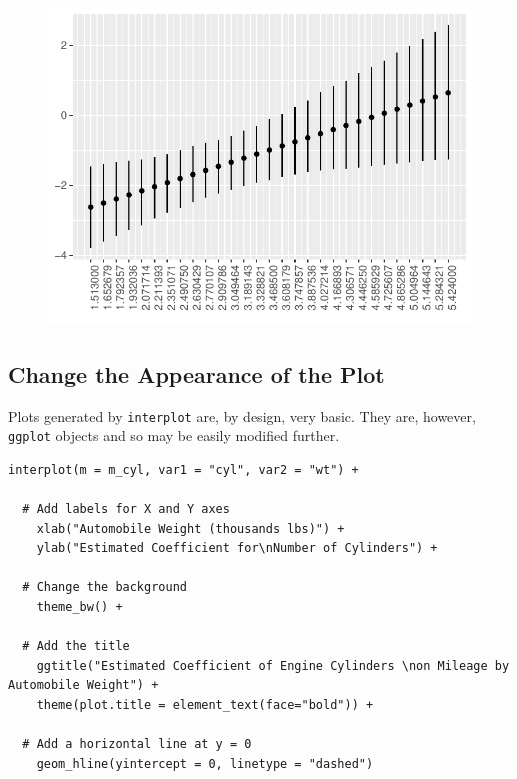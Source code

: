 \documentclass[
  article]{jss}
\begin{document}
\begin{figure}[H]

{\centering \includegraphics{jss_manuscript_files/figure-pdf/unnamed-chunk-6-1.pdf}

}

\end{figure}

\hypertarget{sec-change-the-appearance-of-the-plot}{%
\subsection{Change the Appearance of the
Plot}\label{sec-change-the-appearance-of-the-plot}}

Plots generated by \texttt{interplot} are, by design, very basic. They
are, however, \texttt{ggplot} objects and so may be easily modified
further.

\begin{verbatim}
interplot(m = m_cyl, var1 = "cyl", var2 = "wt") + 

  # Add labels for X and Y axes
    xlab("Automobile Weight (thousands lbs)") +
    ylab("Estimated Coefficient for\nNumber of Cylinders") +
    
  # Change the background
    theme_bw() +
    
  # Add the title
    ggtitle("Estimated Coefficient of Engine Cylinders \non Mileage by Automobile Weight") +
    theme(plot.title = element_text(face="bold")) +
    
  # Add a horizontal line at y = 0
    geom_hline(yintercept = 0, linetype = "dashed")
\end{verbatim}
\end{document}
